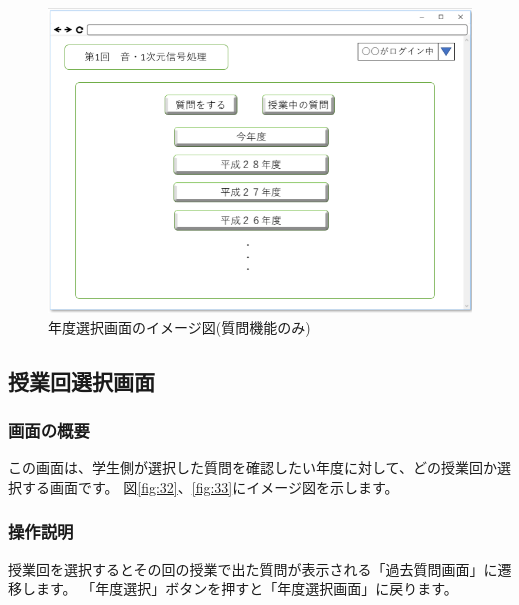 \begin{figure}[phtbp]
  \begin{center}
    \includegraphics[width=1\linewidth,clip]{./img/31.png}
    \caption{年度選択画面のイメージ図(質問機能のみ)}\label{fig:31}
  \end{center}
\end{figure}

\newpage

\subsection{授業回選択画面}
\subsubsection{画面の概要}
この画面は、学生側が選択した質問を確認したい年度に対して、どの授業回か選択する画面です。
図\ref{fig:32}、\ref{fig:33}にイメージ図を示します。

\subsubsection{操作説明}
授業回を選択するとその回の授業で出た質問が表示される「過去質問画面」に遷移します。
「年度選択」ボタンを押すと「年度選択画面」に戻ります。

